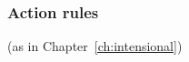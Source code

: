 \begin{description}
      

  


\end{description}



\subsubsection{Action rules} (as in Chapter~\ref{ch:intensional})


  






  


